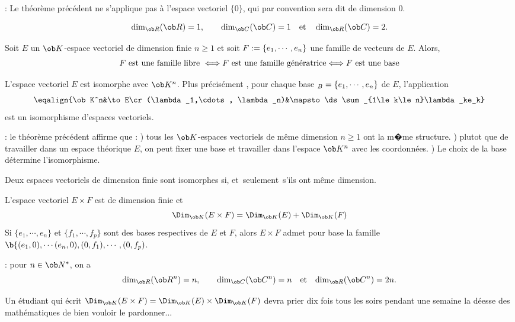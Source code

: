\Remarque : Le th\'eor\`eme pr\'ec\'edent ne s'applique pas \`a l'espace vectoriel $\{0\}$, qui par convention sera dit de dimension $0$. 
\bigskip

\Theoreme 
$$
\dim_{\ob R}(\ob R)=1, \qquad\dim_{\ob C}(\ob C)=1\quad \mbox{et}\quad\dim_{\ob R}(\ob C)=2.
$$



\Propriete []  Soit $E$ un $\ob K$-espace vectoriel de dimension finie $n\ge1$ et soit $\sc F:=\{e_1,\cdots,e_n\}$ une famille de vecteurs de $E$. 
Alors, 
$$
\sc F\mbox{ est une famille libre }\Longleftrightarrow\sc F\mbox{ est une famille g\'en\'eratrice}
\Longleftrightarrow \sc F\mbox{ est une base}
$$ 

L'espace vectoriel $E$ est isomorphe avec $\ob K^n$. 
Plus pr\'ecis\'ement , pour chaque base $\sb B=\{e_1,\cdots,e_n\}$ de $E$, l'application
$$
\eqalign{\ob K^n&\to E\cr 
(\lambda_1,\cdots, \lambda_n)&\mapsto \ds\sum_{1\le k\le n}\lambda_ke_k}
$$
est un isomorphisme d'espaces vectoriels. 

\Remarque : le th\'eor\`eme pr\'ec\'edent affirme que : ) tous les $\ob K$-espaces vectoriels de m\^eme dimension $n\ge1$ ont la m�me structure. ) plutot que de travailler dans un espace th\'eorique $E$, on peut fixer une base et travailler dans l'espace $\ob K^n$ avec les coordonn\'ees. ) Le choix de la base d\'etermine l'isomorphisme. 
\bigskip

\Theoreme Deux espaces vectoriels de dimension finie sont isomorphes si, et~seulement~s'ils ont m\^eme dimension. 

L'espace vectoriel $E\times F$ est de dimension finie et 
$$
{\Dim_{\ob K}(E\times F)=\Dim_{\ob K}(E)+\Dim_{\ob K}(F)}
$$ 
Si $\{e_1,\cdots,e_n\}$ et $\{f_1,\cdots,f_p\}$ sont des bases respectives de $E$ et $F$, alors $E\times F$ admet pour base la famille $\b\{(e_1,0),\cdots(e_n,0),(0,f_1),\cdots, (0,f_p)$. 

\Remarque : pour $n\in\ob N^*$, on a 
$$
{\dim_{\ob R}(\ob R^n)=n}, \qquad {\dim_{\ob C}(\ob C^n)=n}\quad \mbox{et}\quad{\dim_{\ob R}(\ob C^n)=2n}.
$$
\medskip

 Un \'etudiant qui \'ecrit $\Dim_{\ob K}(E\times F)=\Dim_{\ob K}(E)\times\Dim_{\ob K}(F)$ devra prier dix fois tous les soirs pendant une semaine la d\'eesse des math\'ematiques de bien vouloir le pardonner... 
\bigskip


